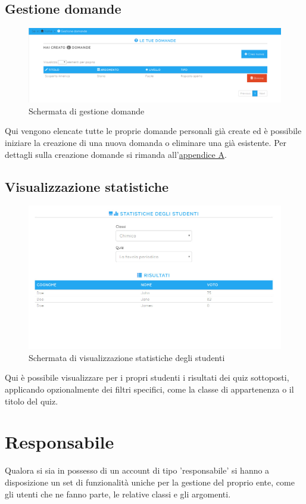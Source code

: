 \documentclass[a4paper, titlepage]{article}
\begin{document}
	 \subsection{Gestione domande}
	 \begin{figure}[!h]
	 	\centering
	 	\includegraphics[scale=0.33]{Img/screen_gestioneDomande.png}
	 	\caption{Schermata di gestione domande}
	 \end{figure}
	 Qui vengono elencate tutte le proprie domande personali già create ed è possibile iniziare la creazione di una nuova domanda o eliminare una già esistente. Per dettagli sulla creazione domande si rimanda all'\hyperref[domande]{appendice A}.
	 
	 \subsection{Visualizzazione statistiche}
	 \begin{figure}[!h]
	 	\centering
	 	\includegraphics[scale=0.33]{Img/screen_StatisticheStudenti.png}
	 	\caption{Schermata di visualizzazione statistiche degli studenti}
	 \end{figure}
	 Qui è possibile visualizzare per i propri studenti i risultati dei quiz sottoposti, applicando opzionalmente dei filtri specifici, come la classe di appartenenza o il titolo del quiz.
	 
	 \newpage
	 \section{Responsabile}
	 Qualora si sia in possesso di un account di tipo 'responsabile' si hanno a disposizione un set di funzionalità uniche per la gestione del proprio ente, come gli utenti che ne fanno parte, le relative classi e gli argomenti.
	 
\end{document}
